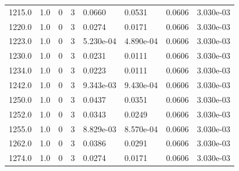 \documentclass[preview]{standalone}
\begin{document}
{{{{{{{\begin{tabular}{L{1.2cm}C{1.2cm} C{0.3cm}C{0.5cm} C{1.4cm}C{1.4cm} C{1.4cm}C{1.4cm}}
  1215.0  &   1.0  & 0     &  3 &  0.0660  & 0.0531  & 0.0606 &  3.030e-03   \\ 
  1220.0  &   1.0  & 0     &  3 &  0.0274  & 0.0171  & 0.0606 &  3.030e-03   \\ 
  1223.0  &   1.0  & 0     &  3 &  5.230e-04  & 4.890e-04  & 0.0606 &  3.030e-03   \\ 
  1230.0  &   1.0  & 0     &  3 &  0.0231  & 0.0111  & 0.0606 &  3.030e-03   \\ 
  1234.0  &   1.0  & 0     &  3 &  0.0223  & 0.0111  & 0.0606 &  3.030e-03   \\ 
  1242.0  &   1.0  & 0     &  3 &  9.343e-03  & 9.430e-04  & 0.0606 &  3.030e-03   \\ 
  1250.0  &   1.0  & 0     &  3 &  0.0437  & 0.0351  & 0.0606 &  3.030e-03   \\ 
  1252.0  &   1.0  & 0     &  3 &  0.0343  & 0.0249  & 0.0606 &  3.030e-03   \\ 
  1255.0  &   1.0  & 0     &  3 &  8.829e-03  & 8.570e-04  & 0.0606 &  3.030e-03   \\ 
  1262.0  &   1.0  & 0     &  3 &  0.0386  & 0.0291  & 0.0606 &  3.030e-03   \\ 
  1274.0  &   1.0  & 0     &  3 &  0.0274  & 0.0171  & 0.0606 &  3.030e-03   \\ 
\hline 
\end{tabular} 

}}}}}}}
\end{document}
